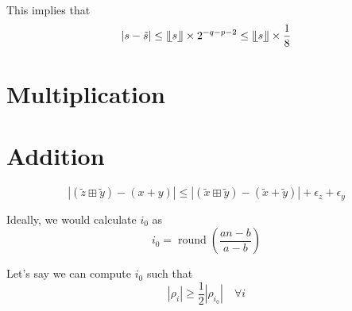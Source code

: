 \documentclass{article}
\DeclareMathOperator*{\round}{round}
\begin{document}
This implies that
\begin{equation*}
  |s - \tilde s| \leq \llfloor s \rrfloor \times 2^{-q-p-2} \leq \llfloor s \rrfloor \times \frac{1}{8}
\end{equation*}

\section{Multiplication}
\label{sec:multiplication}

\section{Addition}
\label{sec:addition}

\begin{equation*}
  |(\tilde z \boxplus \tilde y) - (x + y) | \leq |(\tilde x \boxplus \tilde y) - (\tilde x + \tilde y)| + \epsilon_z + \epsilon_y
\end{equation*}




Ideally, we would calculate $i_0$ as
\begin{equation*}
  i_0 = \round \left(\frac{a n - b }{a-b} \right)
\end{equation*}

Let's say we can compute $i_0$ such that
\begin{equation*}
  |\rho_i| \geq \frac{1}{2} |\rho_{i_0}| \quad \forall i
\end{equation*}



\end{document}
